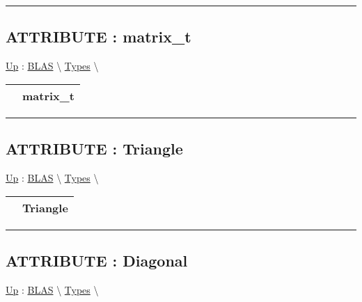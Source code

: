 \par


\rule{\linewidth}{0.5pt}
\subsection*{ATTRIBUTE : matrix\_t}
\hypertarget{ecldoc:blas.types.matrix_t}{}
\hyperlink{ecldoc:BLAS.Types}{Up} :
\hspace{0pt} \hyperlink{ecldoc:BLAS}{BLAS} \textbackslash 
\hspace{0pt} \hyperlink{ecldoc:BLAS.Types}{Types} \textbackslash 

{\renewcommand{\arraystretch}{1.5}
\begin{tabularx}{\textwidth}{|>{\raggedright\arraybackslash}l|X|}
\hline
\hspace{0pt} & matrix\_t \\
\hline
\end{tabularx}
}

\par


\rule{\linewidth}{0.5pt}
\subsection*{ATTRIBUTE : Triangle}
\hypertarget{ecldoc:ecldoc-Triangle}{}
\hyperlink{ecldoc:BLAS.Types}{Up} :
\hspace{0pt} \hyperlink{ecldoc:BLAS}{BLAS} \textbackslash 
\hspace{0pt} \hyperlink{ecldoc:BLAS.Types}{Types} \textbackslash 

{\renewcommand{\arraystretch}{1.5}
\begin{tabularx}{\textwidth}{|>{\raggedright\arraybackslash}l|X|}
\hline
\hspace{0pt} & Triangle \\
\hline
\end{tabularx}
}

\par


\rule{\linewidth}{0.5pt}
\subsection*{ATTRIBUTE : Diagonal}
\hypertarget{ecldoc:ecldoc-Diagonal}{}
\hyperlink{ecldoc:BLAS.Types}{Up} :
\hspace{0pt} \hyperlink{ecldoc:BLAS}{BLAS} \textbackslash 
\hspace{0pt} \hyperlink{ecldoc:BLAS.Types}{Types} \textbackslash 

